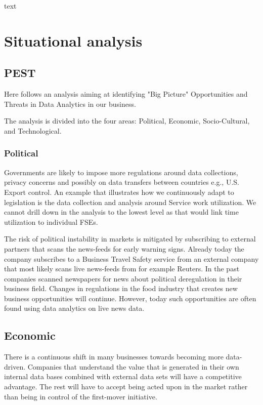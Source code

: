 \documentclass[10pt]{article} %
\begin{document}
text

\section{Situational analysis}
\subsection{PEST}
Here follows an analysis aiming at identifying "Big Picture" Opportunities and Threats in Data Analytics in our business. 

The analysis is divided into the four areas: Political, Economic, Socio-Cultural, and Technological.

\subsubsection{Political}
Governments are likely to impose more regulations around data collections, privacy concerns and possibly on data transfers between countries e.g., U.S. Export control.
An example that illustrates how we continuously adapt to legislation is the data collection and analysis around Service work utilization. We cannot drill down in the analysis to the lowest level as that would link time utilization to individual FSEs.

The risk of political instability in markets is mitigated by subscribing to external partners that scans the news-feeds for early warning signs. Already today the company subscribes to a Business Travel Safety service from an external company that most likely scans live news-feeds from for example Reuters. In the past companies scanned newspapers for news about political deregulation in their business field. Changes in regulations in the food industry that creates new business opportunities will continue. However, today such opportunities are often found using data analytics on live news data.

\subsection{Economic}
There is a continuous shift in many businesses towards becoming more data-driven. Companies that understand the value that is generated in their own internal data bases combined with external data sets will have a competitive advantage. The rest will have to accept being acted upon in the market rather than being in control of the first-mover initiative.
\end{document}
